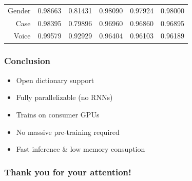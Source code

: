 \documentclass{beamer}
\begin{document}
\begin{frame}
\begin{table}[tb]
\begin{tabular}{r|ccccc}
Gender & 0.98663 & 0.81431 & 0.98090 & 0.97924 & 0.98000  \\
Case & 0.98395 & 0.79896 & 0.96960 & 0.96860 & 0.96895  \\
Voice & 0.99579 & 0.92929 & 0.96404 & 0.96103 & 0.96189  \\
      \end{tabular}
\end{table}
\end{frame}


\begin{frame}
\frametitle{Conclusion}
\begin{itemize}
\item Open dictionary support
\item Fully parallelizable (no RNNs)
\item Trains on consumer GPUs
\item No massive pre-training required
\item Fast inference \& low memory consuption
\end{itemize}
\end{frame}


\begin{frame}
\frametitle{Thank you for your attention!}
\end{frame}
\end{document}
